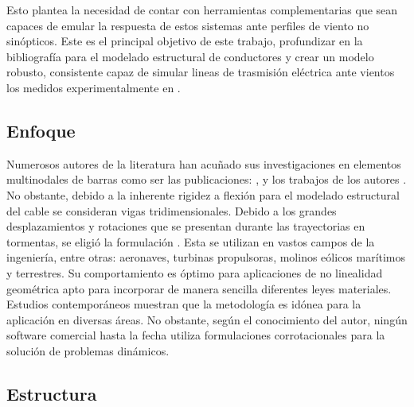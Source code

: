 Esto plantea la necesidad de contar con herramientas complementarias que sean capaces de emular la respuesta de estos sistemas ante perfiles de viento no sinópticos. Este es el principal objetivo de este trabajo, profundizar en la bibliografía para el modelado estructural de conductores y crear un modelo robusto, consistente capaz de simular lineas de trasmisión eléctrica ante vientos los medidos experimentalmente en \cite{stengel2017measurements}. 
  

\subsection{Enfoque}
Numerosos autores de la literatura han acuñado sus investigaciones en elementos multinodales de barras como ser las publicaciones: \citep{desai1995finite}, \citep{yan2009numerical} y los trabajos de los autores \cite{gani2010dynamic} \cite{yang2016nonlinear}. No obstante, debido a la inherente rigidez a flexión para el modelado estructural del cable se consideran vigas tridimensionales. Debido a los grandes desplazamientos y rotaciones que se presentan durante las trayectorias en tormentas, se eligió la formulación \cite{Le2014}. Esta se utilizan en vastos campos de la ingeniería, entre otras: aeronaves, turbinas propulsoras, molinos eólicos marítimos y terrestres. Su comportamiento es óptimo para aplicaciones de no linealidad geométrica apto para incorporar de manera sencilla diferentes leyes materiales. Estudios contemporáneos \citep{albino2018co} \citep{asadi2019multibody}  muestran que la metodología es idónea para la aplicación en diversas áreas. No obstante, según el conocimiento del autor, ningún software comercial hasta la fecha utiliza formulaciones corrotacionales para la solución de problemas dinámicos. 
\subsection{Estructura}